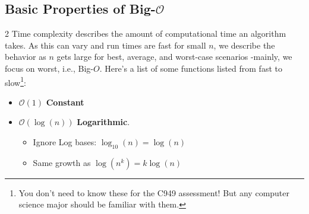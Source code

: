 \documentclass{exam}
\begin{document}
\subsection*{Basic Properties of Big-$\mathcal{O}$}
    \vspace{-.1cm}
    \begin{multicols}{2}
        Time complexity describes the amount of computational time an algorithm takes. As this can vary and run times are fast for small $n$, we describe the behavior as $n$ gets large for best, average, and worst-case scenarios -mainly, we focus on worst, i.e., Big-$O$. Here's a list of some functions listed from fast to slow\footnote[1]{You don't need to know these for the C949 assessment! But any computer science major should be familiar with them.}:
        \begin{itemize}
            \item[] $\mathcal{O}(1)$ \textbf{Constant}
            \item[] $\mathcal{O}(\log(n))$ \textbf{Logarithmic}. 
            \begin{itemize}
                \item[] Ignore Log bases: $\log_{10}(n)=\log(n)$
                \item[] Same growth as $\log(n^{k})=k\log(n)$ 
            \end{itemize}
            

\end{itemize}
\end{multicols}
\end{document}
